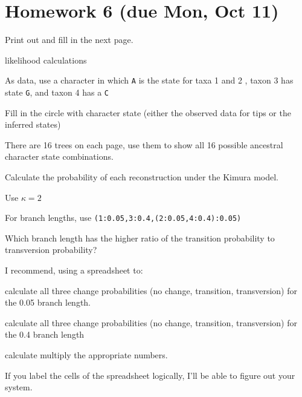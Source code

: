 \documentclass[landscape]{foils}
\begin{document}
\pagecolor{white}


\section*{Homework 6 (due Mon, Oct 11)}
\normalsize
Print out and fill in the next page.
\begin{compactenum}
	\item likelihood calculations
\begin{compactenum}
	\item As data, use a character in which  {\tt A} is the state for taxa 1 and 2 , taxon 3 has state {\tt G}, and taxon 4 has a {\tt C}
	\item Fill in the circle with character state (either the observed data for tips or the inferred states)
	\item There are 16 trees on each page, use them to show all 16 possible ancestral character state combinations.
	\item Calculate the probability of each reconstruction under the Kimura model.
	\item Use $\kappa=2$
	\item For branch lengths, use {\tt(1:0.05,3:0.4,(2:0.05,4:0.4):0.05)}
\end{compactenum}
	\item Which branch length has the higher ratio of the transition probability to transversion probability?
\end{compactenum}
\myNewSlide
I recommend, using a spreadsheet to:
\begin{compactenum}
	\item  calculate all three change probabilities (no change, transition, transversion) for the 0.05 branch length.
	\item  calculate all three change probabilities (no change, transition, transversion) for the 0.4 branch length
	\item  calculate multiply the appropriate numbers.
\end{compactenum}
If you label the cells of the spreadsheet logically, I'll be able to figure out your system.

\end{document}
